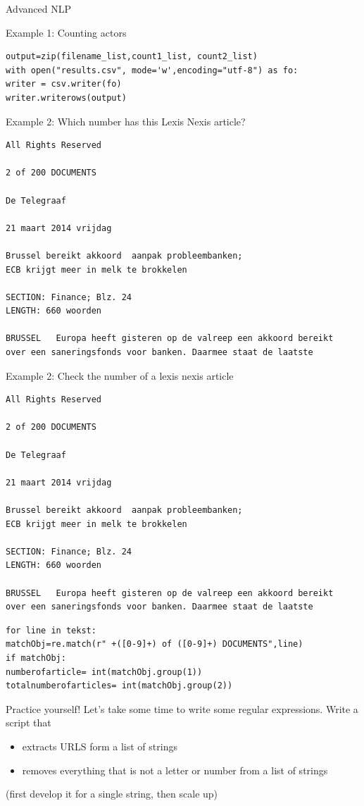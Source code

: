 \documentclass[handout]{beamer}
\begin{document}
\begin{section}{Advanced NLP}
\begin{frame}{Example 1: Counting actors}
\begin{lstlisting}
output=zip(filename_list,count1_list, count2_list)
with open("results.csv", mode='w',encoding="utf-8") as fo:
writer = csv.writer(fo)
writer.writerows(output)
\end{lstlisting}
\end{frame}




\begin{frame}[fragile]{Example 2: Which number has this Lexis Nexis article?}
\begin{lstlisting}
All Rights Reserved

2 of 200 DOCUMENTS

De Telegraaf

21 maart 2014 vrijdag

Brussel bereikt akkoord  aanpak probleembanken;
ECB krijgt meer in melk te brokkelen

SECTION: Finance; Blz. 24
LENGTH: 660 woorden

BRUSSEL   Europa heeft gisteren op de valreep een akkoord bereikt 
over een saneringsfonds voor banken. Daarmee staat de laatste
\end{lstlisting}

\end{frame}

\begin{frame}[fragile]{Example 2: Check the number of a lexis nexis article}
\begin{lstlisting}
All Rights Reserved

2 of 200 DOCUMENTS

De Telegraaf

21 maart 2014 vrijdag

Brussel bereikt akkoord  aanpak probleembanken;
ECB krijgt meer in melk te brokkelen

SECTION: Finance; Blz. 24
LENGTH: 660 woorden

BRUSSEL   Europa heeft gisteren op de valreep een akkoord bereikt 
over een saneringsfonds voor banken. Daarmee staat de laatste
\end{lstlisting}

\begin{lstlisting}
for line in tekst:
matchObj=re.match(r" +([0-9]+) of ([0-9]+) DOCUMENTS",line)
if matchObj:
numberofarticle= int(matchObj.group(1))
totalnumberofarticles= int(matchObj.group(2))
\end{lstlisting}
\end{frame}


\begin{frame}{Practice yourself!}
Let's take some time to write some regular expressions.
Write a script that
\begin{itemize}
\item extracts URLS form a list of strings
\item removes everything that is not a letter or number from a list of strings
\end{itemize}
(first develop it for a single string, then scale up)


\end{frame}
\end{section}
\end{document}

